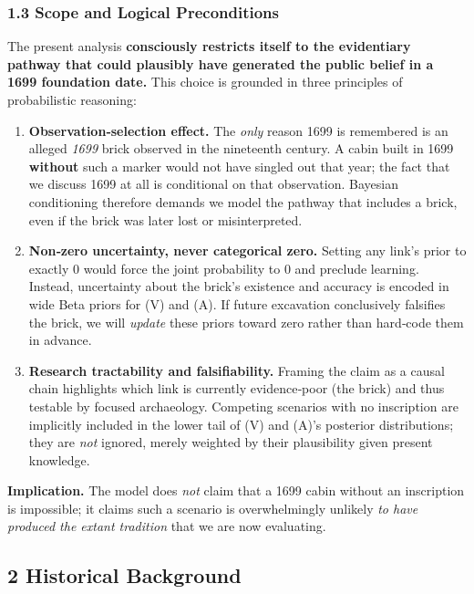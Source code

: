 \documentclass[
  11pt,
]{article}
\providecommand{\tightlist}{%
  \setlength{\itemsep}{0pt}\setlength{\parskip}{0pt}}
\begin{document}
\subsubsection{1.3 Scope and Logical
Preconditions}\label{scope-and-logical-preconditions}

The present analysis \textbf{consciously restricts itself to the
evidentiary pathway that could plausibly have generated the public
belief in a 1699 foundation date.} This choice is grounded in three
principles of probabilistic reasoning:

\begin{enumerate}
\def\labelenumi{\arabic{enumi}.}
\tightlist
\item
  \textbf{Observation‑selection effect.} The \emph{only} reason 1699 is
  remembered is an alleged \emph{1699} brick observed in the nineteenth
  century. A cabin built in 1699 \textbf{without} such a marker would
  not have singled out that year; the fact that we discuss 1699 at all
  is conditional on that observation. Bayesian conditioning therefore
  demands we model the pathway that includes a brick, even if the brick
  was later lost or misinterpreted.
\item
  \textbf{Non‑zero uncertainty, never categorical zero.} Setting any
  link's prior to exactly 0 would force the joint probability to 0 and
  preclude learning. Instead, uncertainty about the brick's existence
  and accuracy is encoded in wide Beta priors for (V) and (A). If future
  excavation conclusively falsifies the brick, we will \emph{update}
  these priors toward zero rather than hard‑code them in advance.
\item
  \textbf{Research tractability and falsifiability.} Framing the claim
  as a causal chain highlights which link is currently evidence‑poor
  (the brick) and thus testable by focused archaeology. Competing
  scenarios with no inscription are implicitly included in the lower
  tail of (V) and (A)'s posterior distributions; they are \emph{not}
  ignored, merely weighted by their plausibility given present
  knowledge.
\end{enumerate}

\textbf{Implication.} The model does \emph{not} claim that a 1699 cabin
without an inscription is impossible; it claims such a scenario is
overwhelmingly unlikely \emph{to have produced the extant tradition}
that we are now evaluating.

\subsection{2 Historical Background}\label{historical-background}
\end{document}
